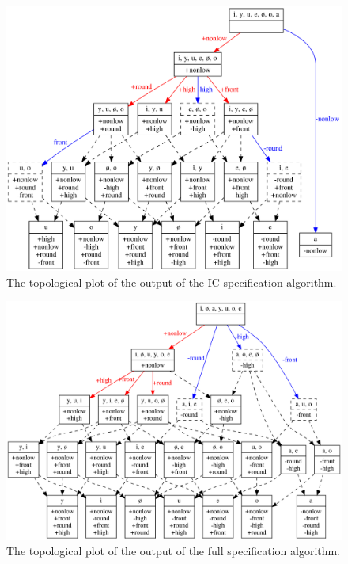 \documentclass[12pt, oneside]{article}   	%
\begin{document}
\begin{figure}[htb!]
	\centering
	\includegraphics[width=\textwidth]{vowel_inventory_contrastive_TOPOLOGICAL.png}
	\caption{The topological plot of the output of the IC specification algorithm.}
	\label{fig:vowelcontrastivetopological}
\end{figure}

\begin{figure}[htb!]
\centering
\includegraphics[width=\textwidth]{vowel_inventory_full_TOPOLOGICAL.png}
\caption{The topological plot of the output of the full specification algorithm.}
\label{fig:vowelfulltopological}
\end{figure}



\end{document}
